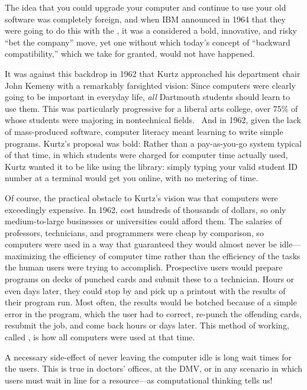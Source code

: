 \documentclass{article}
\begin{document}
  \begin{geeknote}
  The idea that
  you could upgrade your computer and continue to use your old software
  was completely foreign, and when IBM announced in 1964 that
  they were going to do this with the , it was a considered a bold,
  innovative, and risky ``bet the
  company'' move, yet one without which today's concept of ``backward
  compatibility,'' which we take for granted, would not have happened.
  \end{geeknote}

It was against this backdrop 
in 1962 that Kurtz approached
his department chair John Kemeny with a remarkably farsighted vision:
Since computers were clearly going to be important in everyday
life, \emph{all} Dartmouth students should learn to use them.  This was
particularly progressive for a liberal arts college,
over 75\% of whose students were majoring in nontechnical fields.~\cite{goto}
And in 1962, given the lack of mass-produced software,
computer literacy meant learning to
write simple programs.
Kurtz's proposal was bold: Rather than a
pay-as-you-go system typical of that time, in which students were
charged for computer time 
actually used,
Kurtz wanted it to be like using the library:
simply typing your valid student ID number at a terminal would get you
online, with no metering of time.

Of course, the practical obstacle to Kurtz's vision was that
computers were exceedingly expensive.  In 1962,  
cost hundreds of thousands of dollars, so only medium-to-large 
businesses or universities could afford them.  
The salaries of professors, technicians, and programmers were
cheap by comparison, so computers were used in a way that guaranteed
they would almost never be idle---maximizing the efficiency of computer
time rather than the efficiency of the tasks the human users were trying
to accomplish.
Prospective users would prepare programs on decks of punched
cards and submit these to a technician.  
Hours or even days later, they
could stop by and pick up a printout with the results of their program run.
Most often, the results would be botched because of a simple error in
the program, which the user had to correct, re-punch the offending
cards, resubmit the job, and come back hours or days later.  This method
of working, called , is how all computers were used
at that time.

  \begin{geeknote}
  A necessary side-effect of never leaving the computer idle is long wait
  times for the users.  This is true in doctors' offices, at the DMV, or
  in any scenario in which users must wait in line for a resource---as
  computational thinking tells us!
  \end{geeknote}
\end{document}
